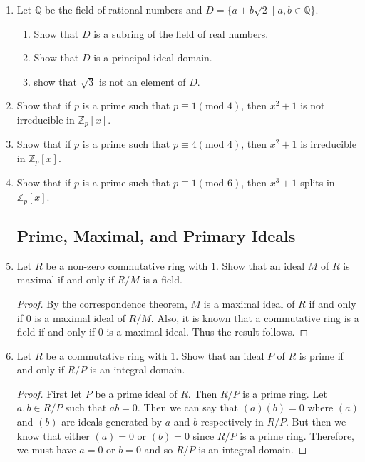 \documentclass{article}
\theoremstyle{definition}
\newcommand{\m}[1]{(\text{mod }{#1})}
\newcommand{\Z}{\mathbb{Z}}
\newcommand{\Q}{\mathbb{Q}}
\begin{document}
\begin{enumerate}
            \item Let $\Q$ be the field of rational numbers and $D=\{a+b\sqrt{2}\mid a,b\in \Q\}$. 
            
            \begin{enumerate}
                \item Show that $D$ is a subring of the field of real numbers.
                \item Show that $D$ is a principal ideal domain.
                \item show that $\sqrt{3}$ is not an element of $D$.
            \end{enumerate}

            \item Show that if $p$ is a prime such that $p\equiv 1 \m{4}$, then $x^2+1$ is not irreducible in $\Z_p[x]$.
            
            \item Show that if $p$ is a prime such that $p \equiv 4\m{4}$, then $x^2+1$ is irreducible in $\Z_p[x]$.
            
            \item Show that if $p$ is a prime such that $p\equiv 1\m{6}$, then $x^3+1$ splits in $\Z_p[x]$.
        
        \subsection{Prime, Maximal, and Primary Ideals}

            \item Let $R$ be a non-zero commutative ring with $1$. Show that an ideal $M$ of $R$ is maximal if and only if $R/M$ is a field.
            
            \begin{proof}
                By the correspondence theorem, $M$ is a maximal ideal of $R$ if and only if $0$ is a maximal ideal of $R/M$. Also, it is known that a commutative ring is a field if and only if $0$ is a maximal ideal. Thus the result follows.
            \end{proof}

            \item Let $R$ be a commutative ring with $1$. Show that an ideal $P$ of $R$ is prime if and only if $R/P$ is an integral domain.
            
            \begin{proof}
                First let $P$ be a prime ideal of $R$. Then $R/P$ is a prime ring. Let $a,b \in R/P$ such that $ab=0$. Then we can say that $(a)(b)=0$ where $(a)$ and $(b)$ are ideals generated by $a$ and $b$ respectively in $R/P$. But then we know that either $(a)=0$ or $(b)=0$ since $R/P$ is a prime ring. Therefore, we must have $a=0$ or $b=0$ and so $R/P$ is an integral domain.


\end{proof}
\end{enumerate}
\end{document}
